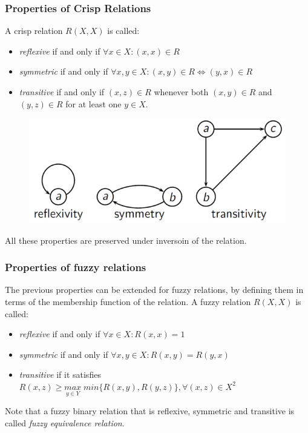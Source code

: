 \documentclass{article}
\begin{document}
\subsubsection{Properties of Crisp Relations}
A crisp relation $R(X,X)$ is called:
\begin{itemize}
    \item \textit{reflexive} if and only if $\forall x\in X: (x,x)\in R$
    \item \textit{symmetric} if and only if $\forall x,y\in X:(x,y)\in R\Leftrightarrow (y,x)\in R$
    \item \textit{transitive} if and only if $(x,z)\in R$ whenever both
          $(x,y)\in R$ and $(y,z)\in R$ for at least one $y\in X$.
\end{itemize}
\begin{figure}[H]
    \centering
    \includegraphics[scale=0.5]{images/RULES_CRISP.png}
\end{figure}
All these properties are preserved under inversoin of the relation.

\subsubsection{Properties of fuzzy relations}
The previous properties can be extended for fuzzy relations, by defining them in terms of the
membership function of the relation. A fuzzy relation $R(X,X)$ is called:
\begin{itemize}
    \item \textit{reflexive} if and only if $\forall x\in X:R(x,x)=1$
    \item \textit{symmetric} if and only if $\forall x,y\in X:R(x,y)=R(y,x)$
    \item \textit{transitive} if it satisfies $R(x,z)\geq\underset{y\in Y}{max}\;min\{R(x,y),R(y,z)\},\forall (x,z)\in X^2$
\end{itemize}
Note that a fuzzy binary relation that is reflexive, symmetric and transitive is called \textit{fuzzy equivalence
    relation}.
\end{document}
